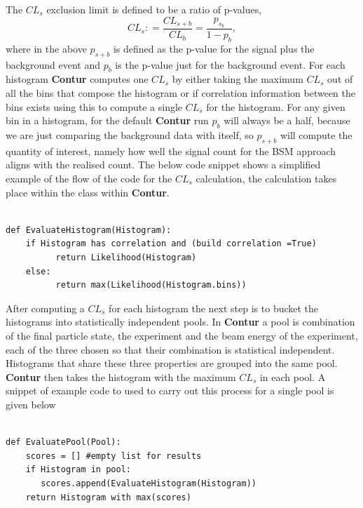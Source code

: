 The $CL_s$ exclusion limit is defined to be a ratio of p-values,
$$ CL_s: = \frac{CL_{s+b}}{CL_{b}} = \frac{p_{s_b}}{1- p_{b}}, $$
where in the above $p_{s+b}$ is defined as the p-value for the signal plus the background event and $p_{b}$ is the p-value just for the background event. For each histogram \textbf{Contur} computes one $CL_{s}$ by either taking the maximum $CL_{s}$ out of all the bins that compose the histogram or if correlation information between the bins exists using this to compute a single $CL_s$ for the histogram. For any given bin in a histogram, for the default \textbf{Contur} run $p_b$ will always be a half, because we are just comparing the background data with itself, so $p_{s+b}$ will compute the quantity of interest, namely how well the signal count for the BSM approach aligns with the realised count. The below code snippet shows a simplified example of the  flow of the code for the $CL_s$ calculation, the calculation takes place within the  class within \textbf{Contur}.

\begin{code}
\label{code:histo}
\begin{verbatim}

def EvaluateHistogram(Histogram):
    if Histogram has correlation and (build correlation =True)
          return Likelihood(Histogram)
    else:
          return max(Likelihood(Histogram.bins))
\end{verbatim}
\end{code}

After computing a $CL_{s}$ for each histogram the next step is to bucket the histograms into statistically independent pools. In \textbf{Contur} a pool is combination of the final particle state, the experiment and the beam energy of the experiment, each of the three chosen so that their combination is statistical independent. Histograms that share these three properties are grouped into the same pool. \textbf{Contur} then takes the histogram with the maximum $CL_s$ in each pool. A snippet of example code to used to carry out this process for a single pool is given below

\begin{code}
\label{code:pools}
\begin{verbatim}

def EvaluatePool(Pool):
    scores = [] #empty list for results
    if Histogram in pool:
       scores.append(EvaluateHistogram(Histogram))
    return Histogram with max(scores)
\end{verbatim}
\end{code}

